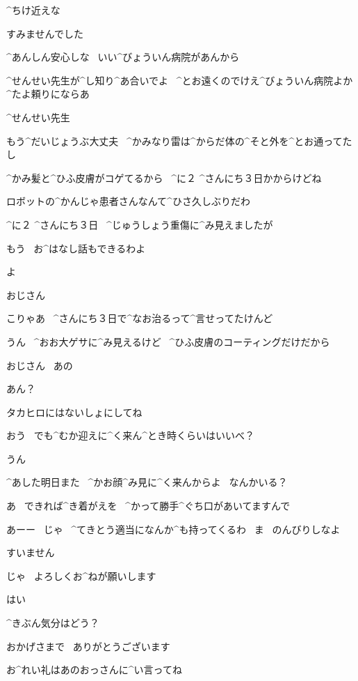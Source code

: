 \page[83]
\Ojisan ^{ちけ}{近}えな

\page[85]
\Alpha すみませんでした

\Ojisan ^{あんしん}{安心}しな
\ いい^{びょういん}{病院}があんから

\Ojisan ^{せんせい}{先生}が^{し}{知}り^{あ}{合}いでよ
\ ^{とお}{遠}くのでけえ^{びょういん}{病院}よか^{たよ}{頼}りにならあ

\page[88]
\Ojisan ^{せんせい}{先生}

\Sensei もう^{だいじょうぶ}{大丈夫}
\ ^{かみなり}{雷}は^{からだ}{体}の^{そと}{外}を^{とお}{通}ってたし

\Sensei ^{かみ}{髪}と^{ひふ}{皮膚}がコゲてるから
\ ^{に}{２} ^{さんにち}{３日}かからけどね

\Sensei ロボットの^{かんじゃ}{患者}さんなんて^{ひさ}{久}しぶりだわ

\Ojisan ^{に}{２} ^{さんにち}{３日}
\ ^{じゅうしょう}{重傷}に^{み}{見}えましたが

\Sensei もう
\ お^{はなし}{話}もできるわよ

\page[89]
\Ojisan よ

\Alpha おじさん

\Ojisan こりゃあ
\ ^{さんにち}{３日}で^{なお}{治}るって^{言}{せ}ってたけんど

\Alpha うん
\ ^{おお}{大}ゲサに^{み}{見}えるけど
\ ^{ひふ}{皮膚}のコーティングだけだから

\Alpha おじさん
\ あの

\Ojisan あん？

\Alpha タカヒロにはないしょにしてね

\page[90]
\Ojisan おう
\ でも^{むか}{迎}えに^{く}{来}ん^{とき}{時}くらいはいいべ？

\Alpha うん

\Ojisan ^{あした}{明日}また
\ ^{かお}{顔}^{み}{見}に^{く}{来}んからよ
\ なんかいる？

\Alpha あ
\ できれば^{き}{着}がえを
\ ^{かって}{勝手}^{ぐち}{口}があいてますんで

\Ojisan あーー
\ じゃ
\ ^{てきとう}{適当}になんか^{も}{持}ってくるわ
\ ま
\ のんびりしなよ

\Alpha すいません

\Ojisan じゃ
\ よろしくお^{ねが}{願}いします

\Sensei はい

\page[91]
\Sensei ^{きぶん}{気分}はどう？

\Alpha おかげさまで
\ ありがとうございます

\Sensei お^{れい}{礼}はあのおっさんに^{い}{言}ってね

